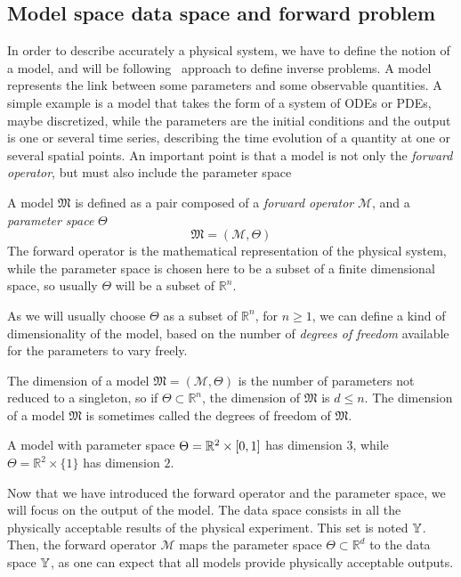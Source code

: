 \documentclass[../../Main_ManuscritThese.tex]{subfiles}
\begin{document}
 \subsection{Model space data space and forward problem}
\label{sec:model_space_data_space}
In order to describe accurately a physical system, we have to define the notion of a model, and will be following~\cite{tarantola_inverse_2005} approach to define inverse problems.
 A model represents the link between some parameters and some observable quantities. A simple example is a model that takes the form of a system of ODEs or PDEs, maybe discretized, while the parameters are the initial conditions and the output is one or several time series, describing the time evolution of a quantity at one or several spatial points. An important point is that a model is not only the \emph{forward operator}, but must also include the parameter space

\begin{definition}[Model]
  A model $\mathfrak{M}$ is defined as a pair composed of a \emph{forward operator} $\mathcal{M}$, and a \emph{parameter space} $\Theta$
  \begin{equation}
    \mathfrak{M} = (\mathcal{M}, \Theta)
  \end{equation}
The forward operator is the mathematical representation of the physical system, while the parameter space is chosen here to be a subset of a finite dimensional space, so usually $\Theta$ will be a subset of $\mathbb{R}^n$.
\end{definition}
As we will usually choose $\Theta$ as a subset of $\mathbb{R}^n$, for $n\geq 1$, we can define a kind of dimensionality of the model, based on the number of \emph{degrees of freedom} available for the parameters to vary freely.
\begin{remark}
  \label{rmk:model_dimension}
  The dimension of a model $\mathfrak{M}=(\mathcal{M},\Theta)$ is the number of parameters not reduced to a singleton, so if $\Theta \subset \mathbb{R}^n$, the dimension of $\mathfrak{M}$ is $d \leq n$. The dimension of a model $\mathfrak{M}$ is sometimes called the degrees of freedom of $\mathfrak{M}$.
  \end{remark}
  
\begin{example}
  A model with parameter space $\Theta = \mathbb{R}^2\times \interval{0}{1}$ has dimension $3$, while $\Theta = \mathbb{R}^2 \times \{1\}$ has dimension $2$.
\end{example}
 Now that we have introduced the forward operator and the parameter space, we will focus on the output of the model.
The data space consists in all the physically acceptable results of the physical experiment. This set is noted $\mathbb{Y}$.
Then, the forward operator $\mathcal{M}$ maps the parameter space $\Theta \subset \mathbb{R}^{d}$ to the data space $\mathbb{Y}$, as one can expect that all models provide physically acceptable outputs.
\end{document}
